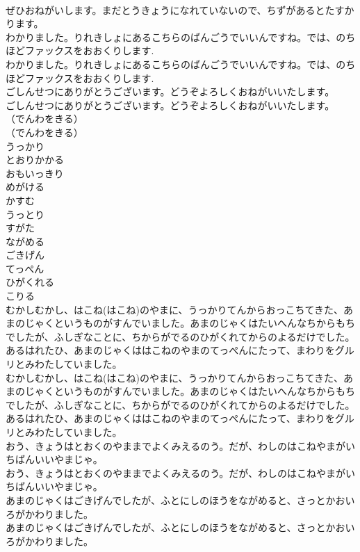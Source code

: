 \documentclass[8pt]{extreport}
\begin{document}
\begin{CJK}{UTF8}{min}
\\	ぜひおねがいします。まだとうきょうになれていないので、ちずがあるとたすかります。
\\	わかりました。りれきしょにあるこちらのばんごうでいいんですね。では、のちほどファックスをおおくりします.
\\	わかりました。りれきしょにあるこちらのばんごうでいいんですね。では、のちほどファックスをおおくりします.
\\	ごしんせつにありがとうございます。どうぞよろしくおねがいいたします。
\\	ごしんせつにありがとうございます。どうぞよろしくおねがいいたします。
\\	（でんわをきる）
\\	（でんわをきる）
\\	うっかり
\\	とおりかかる
\\	おもいっきり
\\	めがける
\\	かすむ
\\	うっとり
\\	すがた
\\	ながめる
\\	ごきげん
\\	てっぺん
\\	ひがくれる
\\	こりる
\\	むかしむかし、はこね(はこね)のやまに、うっかりてんからおっこちてきた、あまのじゃくというものがすんでいました。あまのじゃくはたいへんなちからもちでしたが、ふしぎなことに、ちからがでるのひがくれてからのよるだけでした。あるはれたひ、あまのじゃくははこねのやまのてっぺんにたって、まわりをグルリとみわたしていました。
\\	むかしむかし、はこね(はこね)のやまに、うっかりてんからおっこちてきた、あまのじゃくというものがすんでいました。あまのじゃくはたいへんなちからもちでしたが、ふしぎなことに、ちからがでるのひがくれてからのよるだけでした。あるはれたひ、あまのじゃくははこねのやまのてっぺんにたって、まわりをグルリとみわたしていました。
\\	おう、きょうはとおくのやままでよくみえるのう。だが、わしのはこねやまがいちばんいいやまじゃ。
\\	おう、きょうはとおくのやままでよくみえるのう。だが、わしのはこねやまがいちばんいいやまじゃ。
\\	あまのじゃくはごきげんでしたが、ふとにしのほうをながめると、さっとかおいろがかわりました。
\\	あまのじゃくはごきげんでしたが、ふとにしのほうをながめると、さっとかおいろがかわりました。

\end{CJK}
\end{document}
